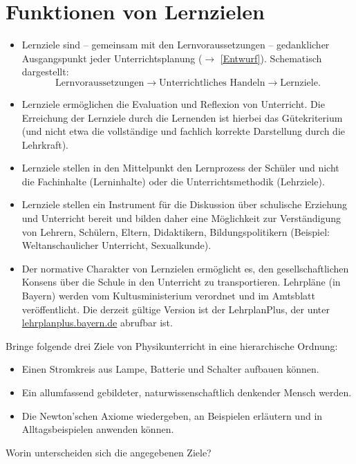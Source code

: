 \section{Funktionen von Lernzielen}
\begin{itemize}
	\item Lernziele sind -- gemeinsam mit den Lernvoraussetzungen -- gedanklicher Ausgangspunkt jeder Unterrichtsplanung ($\to$ \cref{Entwurf}). Schematisch dargestellt: \begin{equation*}
		\text{Lernvoraussetzungen} \longrightarrow \text{Unterrichtliches Handeln} \longrightarrow \text{Lernziele.}
	\end{equation*}
	\item Lernziele ermöglichen die Evaluation und Reflexion von Unterricht. Die Erreichung der Lernziele durch die Lernenden ist hierbei das Gütekriterium (und nicht etwa die vollständige und fachlich korrekte Darstellung durch die Lehrkraft).
	\item Lernziele stellen in den Mittelpunkt den Lernprozess der
	Sch\"{u}ler und nicht die Fachinhalte (Lerninhalte) oder
	die Unterrichtsmethodik (Lehrziele).
	\item
	Lernziele stellen ein Instrument f\"{u}r die Diskussion \"{u}ber
	schulische Erziehung und Unterricht bereit und bilden
	daher eine M\"{o}glichkeit zur Verst\"{a}ndigung von Lehrern,
	Sch\"{u}lern, Eltern, Didaktikern, Bildungspolitikern
	(Beispiel: Weltanschaulicher Unterricht, Sexualkunde).
	\item
	Der normative Charakter von Lernzielen erm\"{o}glicht es, den
	gesellschaftlichen Konsens \"{u}ber die Schule in den Unterricht zu
	transportieren. Lehrpl\"{a}ne (in Bayern) werden vom Kultusministerium verordnet
	und im Amtsblatt ver\"{o}ffentlicht. Die derzeit gültige Version ist der LehrplanPlus, der unter \url{lehrplanplus.bayern.de} abrufbar ist.
\end{itemize}

\begin{uea}
	Bringe folgende drei Ziele von Physikunterricht in eine hierarchische Ordnung:
	\begin{itemize}
		\item Einen Stromkreis aus Lampe, Batterie und Schalter aufbauen können.
		\item Ein allumfassend gebildeter, naturwissenschaftlich denkender Mensch werden.
		\item Die Newton'schen Axiome wiedergeben, an Beispielen erläutern und in Alltagsbeispielen anwenden können. 
	\end{itemize}
	Worin unterscheiden sich die angegebenen Ziele?
\end{uea}

